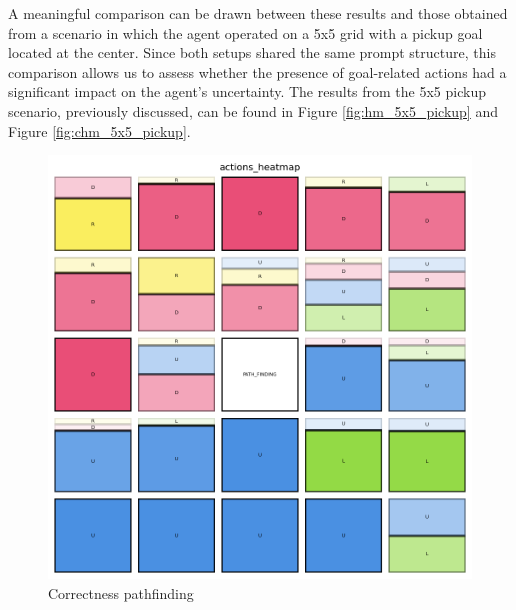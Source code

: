 A meaningful comparison can be drawn between these results and those obtained
from a scenario in which the agent operated on a 5x5 grid with a pickup goal
located at the center. Since both setups shared the same prompt structure, this
comparison allows us to assess whether the presence of goal-related actions had
a significant impact on the agent's uncertainty. The results from the 5x5 pickup
scenario, previously discussed, can be found in Figure \ref{fig:hm_5x5_pickup} and
Figure \ref{fig:chm_5x5_pickup}.

\begin{figure}[h!]
  \centering
  \begin{minipage}[b]{0.45\textwidth}
    \centering
    \includegraphics[width=\textwidth]{
      images/results_discussion/path_finding/actions_heatmap.png
    }
    \caption{Correctness pathfinding }
    \label{fig:path_finding_hm}
  \end{minipage}
  \hfill
  \begin{minipage}[b]{0.45\textwidth}
    \centering

\end{minipage}
\end{figure}
